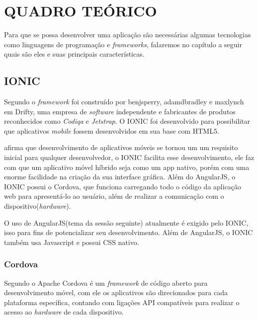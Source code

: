 \chapter{QUADRO TEÓRICO}

	\par Para que se possa desenvolver uma aplicação são necessárias algumas tecnologias como linguagens de programação e \textit{frameworks}, falaremos no capítulo a seguir quais são eles e suas principais características.

\section{IONIC}
	\par Segundo  o \textit{framework} foi construído por benjsperry, adamdbradley e maxlynch em Drifty, uma empresa de \textit{software} independente e fabricantes de produtos reconhecidos como \textit{Codiqa} e \textit{Jetstrap}. O IONIC foi desenvolvido para possibilitar que aplicativos \textit{mobile} fossem desenvolvidos em sua base com HTML5.
	\par {} afirma que desenvolvimento de aplicativos móveis se tornou um um requisito inicial para qualquer desenvolvedor, o IONIC facilita esse desenvolvimento, ele faz com que um aplicativo móvel híbrido seja como um app nativo, porém com uma enorme facilidade na criação da sua interface gráfica. Além do AngularJS, o IONIC possui o Cordova, que funciona carregando todo o código da aplicação web para apresentá-lo ao usuário, além de realizar a comunicação com o dispositivo(\textit{hardware}).
	\par O uso de AngularJS(tema da sessão seguinte) atualmente é exigido pelo IONIC, isso para fins de potencializar seu desenvolvimento. Além de AngularJS, o IONIC também usa Javascript e possui CSS nativo.
	
	\subsection{Cordova}
		\par Segundo  o Apache Cordova é um \textit{framework} de código aberto para desenvolvimento móvel, com ele os aplicativos são direcionados para cada plataforma específica, contando com ligações API compatíveis para realizar o acesso ao \textit{hardware} de cada dispositivo.

